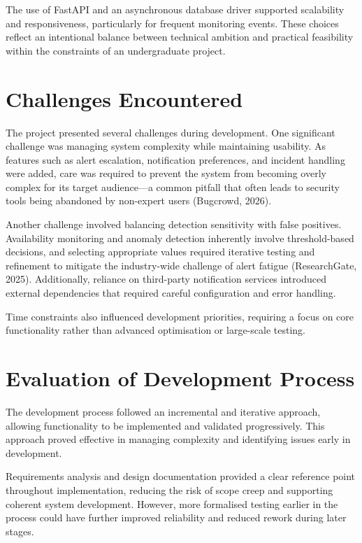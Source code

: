The use of FastAPI and an asynchronous database driver supported scalability and responsiveness, particularly for frequent monitoring events. These choices reflect an intentional balance between technical ambition and practical feasibility within the constraints of an undergraduate project.

\section{Challenges Encountered}

The project presented several challenges during development. One significant challenge was managing system complexity while maintaining usability. As features such as alert escalation, notification preferences, and incident handling were added, care was required to prevent the system from becoming overly complex for its target audience---a common pitfall that often leads to security tools being abandoned by non-expert users (Bugcrowd, 2026).

Another challenge involved balancing detection sensitivity with false positives. Availability monitoring and anomaly detection inherently involve threshold-based decisions, and selecting appropriate values required iterative testing and refinement to mitigate the industry-wide challenge of alert fatigue (ResearchGate, 2025). Additionally, reliance on third-party notification services introduced external dependencies that required careful configuration and error handling.

Time constraints also influenced development priorities, requiring a focus on core functionality rather than advanced optimisation or large-scale testing.

\section{Evaluation of Development Process}

The development process followed an incremental and iterative approach, allowing functionality to be implemented and validated progressively. This approach proved effective in managing complexity and identifying issues early in development.

Requirements analysis and design documentation provided a clear reference point throughout implementation, reducing the risk of scope creep and supporting coherent system development. However, more formalised testing earlier in the process could have further improved reliability and reduced rework during later stages.

